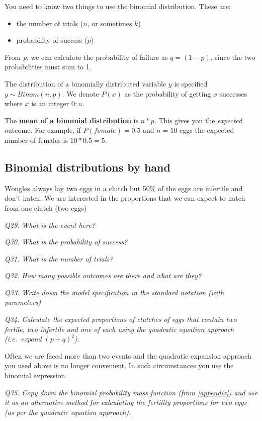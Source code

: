\documentclass[
  11pt,
  a4paper,
]{book}
\providecommand{\tightlist}{%
  \setlength{\itemsep}{0pt}\setlength{\parskip}{0pt}}
\begin{document}
You need to know two things to use the binomial distribution. These are:

\begin{itemize}
\tightlist
\item
  the number of trials (\(n\), or sometimes \(k\))
\item
  probability of success (\(p\))
\end{itemize}

From \emph{p}, we can calculate the probability of failure as \(q = (1-p)\), since the two probabilities must sum to 1.

The distribution of a binomially distributed variable \(y\) is specified \(y \sim Binom(n,p)\). We denote \(P(x)\) as the probability of getting \(x\) successes where \(x\) is an integer \(0:n\).

The \textbf{mean of a binomial distribution} is \(n*p\). This gives you the \emph{expected} outcome. For example, if \(P(female)=0.5\) and \(n=10\) eggs the expected number of females is \(10*0.5=5\).

\hypertarget{binomial-distributions-by-hand}{%
\subsection{Binomial distributions by hand}\label{binomial-distributions-by-hand}}

Wongles always lay two eggs in a clutch but 50\% of the eggs are infertile and don't hatch. We are interested in the proportions that we can expect to hatch from one clutch (two eggs)

\emph{Q29. What is the event here?}

\emph{Q30. What is the probability of success?}

\emph{Q31. What is the number of trials?}

\emph{Q32. How many possible outcomes are there and what are they?}

\emph{Q33. Write down the model specification in the standard notation (with parameters)}

\emph{Q34. Calculate the expected proportions of clutches of eggs that contain two fertile, two infertile and one of each using the quadratic equation approach (i.e.~expand} \((p+q)^2\)\emph{).}

Often we are faced more than two events and the quadratic expansion approach you used above is no longer convenient. In such circumstances you use the binomial expression.

\emph{Q35. Copy down the binomial probability mass function (from \ref{appendix}) and use it as an alternative method for calculating the fertility proportions for two eggs (as per the quadratic equation approach).}
\end{document}
